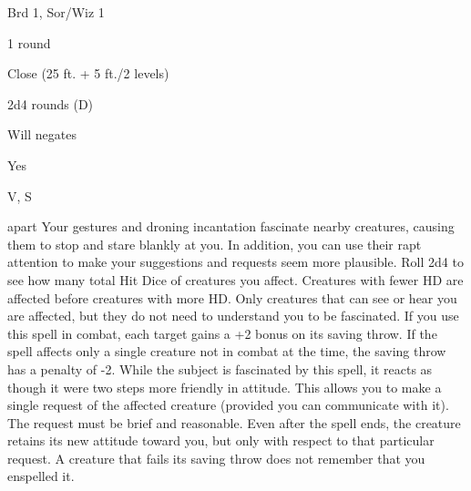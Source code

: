 
\begin{description*}
\item[Level:] Brd 1, Sor/Wiz 1
\item[Casting Time:] 1 round
\item[Range:] Close (25 ft. + 5 ft./2 levels)
\item[Duration:] 2d4 rounds (D)
\item[Saving Throw:] Will negates
\item[Spell Resistance:] Yes
\item[Components:] V, S
\end{description*}

apart
Your gestures and droning incantation fascinate nearby creatures, causing them
to stop and stare blankly at you. In addition, you can use their rapt attention
to make your suggestions and requests seem more plausible. Roll 2d4 to see how
many total Hit Dice of creatures you affect. Creatures with fewer HD are affected
before creatures with more HD. Only creatures that can see or hear you are affected,
but they do not need to understand you to be fascinated.
If you use this spell in combat, each target gains a +2 bonus on its saving throw.
If the spell affects only a single creature not in combat at the time, the saving
throw has a penalty of -2.
While the subject is fascinated by this spell, it reacts as though it were two
steps more friendly in attitude. This allows you to make a single request of the
affected creature (provided you can communicate with it). The request must be brief
and reasonable. Even after the spell ends, the creature retains its new attitude
toward you, but only with respect to that particular request.
A creature that fails its saving throw does not remember that you enspelled it.